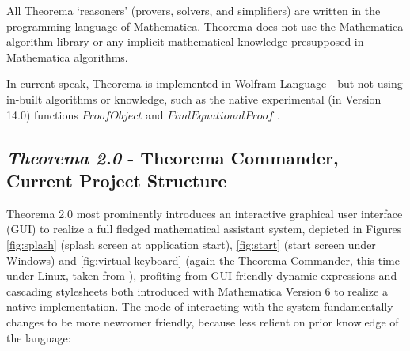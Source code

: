 \begin{displayquote}
All Theorema ‘reasoners’ (provers, solvers, and simplifiers) are written in the programming language of Mathematica. Theorema does not use the Mathematica algorithm library or any implicit mathematical knowledge presupposed in Mathematica algorithms.
\cite[p. 110]{g_mayrhofer_s_saminger__w_winsteiger_theorema_nodate}
\end{displayquote}

In current speak, Theorema is implemented in Wolfram Language - but not using in-built algorithms or knowledge, such as the native experimental (in Version 14.0) functions \( ProofObject \) \cite{noauthor_proofobjectwolfram_nodate} and \( FindEquationalProof \) \cite{noauthor_findequationalproofwolfram_nodate}.

\subsection{\textit{Theorema 2.0} - Theorema Commander, Current Project Structure}

Theorema 2.0 most prominently introduces an interactive graphical user interface (GUI) to realize a full fledged mathematical assistant system, depicted in Figures \ref{fig:splash} (splash screen at application start), \ref{fig:start} (start screen under Windows) and \ref{fig:virtual-keyboard} (again the Theorema Commander, this time under Linux, taken from \cite{windsteiger_theorema_2013}), profiting from GUI-friendly dynamic expressions \cite[p. 76]{noauthor_introduction_nodate} and cascading stylesheets \cite{noauthor_stylesheetswolfram_nodate} both introduced with Mathematica Version 6 to realize a native implementation. The mode of interacting with the system fundamentally changes to be more newcomer friendly, because less relient on prior knowledge of the language:

